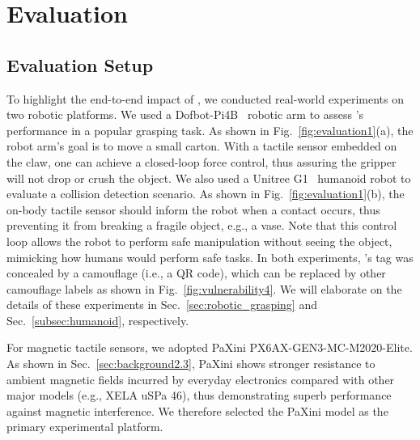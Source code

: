 \section{Evaluation}

\subsection{Evaluation Setup}

To highlight the end-to-end impact of {\name}, we conducted real-world experiments on two robotic platforms. 
We used a Dofbot-Pi4B~\cite{yahboom_dofbot_pi} robotic arm to assess {\name}'s performance in a popular grasping task.
As shown in Fig.~\ref{fig:evaluation1}(a), the robot arm's goal is to move a small carton. 
With a tactile sensor embedded on the claw, one can achieve a closed-loop force control, thus assuring the gripper will not drop or crush the object.
We also used a Unitree G1~\cite{unitree_g1_developer} humanoid robot to evaluate a collision detection scenario.
As shown in Fig.~\ref{fig:evaluation1}(b), the on-body tactile sensor should inform the robot when a contact occurs, thus preventing it from breaking a fragile object, e.g., a vase.
Note that this control loop allows the robot to perform safe manipulation without seeing the object, mimicking how humans would perform safe tasks.
In both experiments, {\name}'s tag was concealed by a camouflage (i.e., a QR code), which can be replaced by other camouflage labels as shown in Fig.~\ref{fig:vulnerability4}.
We will elaborate on the details of these experiments in Sec.~\ref{sec:robotic_grasping} and Sec.~\ref{subsec:humanoid}, respectively.

For magnetic tactile sensors, we adopted PaXini PX6AX-GEN3-MC-M2020-Elite.  As shown in Sec.~\ref{sec:background2.3}, PaXini shows stronger resistance to ambient magnetic fields incurred by everyday electronics compared with other major models (e.g., XELA uSPa 46), thus demonstrating superb performance against magnetic interference.
We therefore selected the PaXini model as the primary experimental platform.

